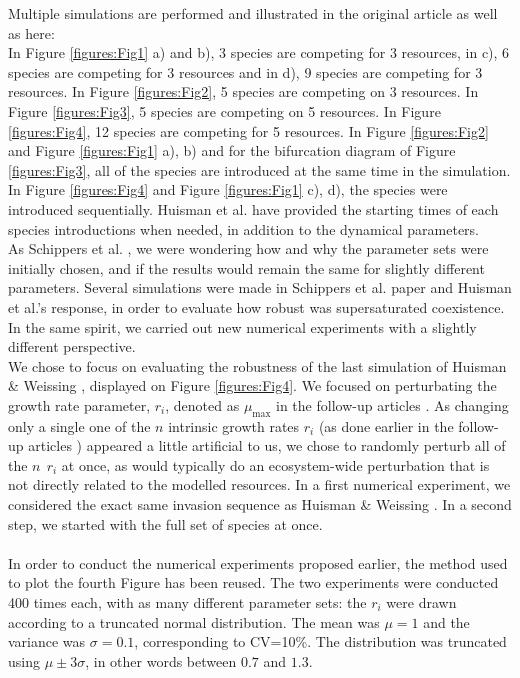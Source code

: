 Multiple simulations are performed and illustrated in the original article as well as here: \\
In Figure \ref{figures:Fig1} a) and b), 3 species are competing for 3 resources, in c), 6 species are competing for 3 resources and in d), 9 species are competing for 3 resources. In Figure \ref{figures:Fig2}, 5 species are competing on 3 resources. In Figure \ref{figures:Fig3}, 5 species are competing on 5 resources. In Figure \ref{figures:Fig4}, 12 species are competing for 5 resources. 
In Figure \ref{figures:Fig2} and Figure \ref{figures:Fig1} a), b) and for the 
bifurcation diagram of Figure \ref{figures:Fig3}, all of the species are 
introduced at the same time in the simulation. In Figure \ref{figures:Fig4} and 
Figure \ref{figures:Fig1} c), d), the species were introduced sequentially. 
Huisman et al. \cite{1999:Huisman} have provided the starting times 
of each species introductions when needed, in addition to the dynamical parameters.\\


As Schippers et al. \cite{2008:Schippers}, we were wondering how and why the parameter sets were initially chosen, 
and if the results would remain the same for slightly different parameters. Several simulations were made in 
Schippers et al. paper \cite{2008:Schippers} and Huisman et al.'s response\cite{2008:Huisman}, in order to evaluate how robust was supersaturated 
coexistence. In the same spirit, we carried out new numerical experiments with a slightly different perspective.\\

We chose to focus on evaluating the robustness of the last simulation of Huisman \& Weissing \cite{1999:Huisman}, displayed on Figure \ref{figures:Fig4}. We focused on perturbating the growth rate parameter, $r_i$, denoted as $\mu_{\text{max}}$ in the follow-up articles \cite{2008:Schippers,2008:Huisman}. 
As changing only a single one of the $n$ intrinsic growth rates $r_i$ (as done earlier in the follow-up articles \cite{2008:Schippers,2008:Huisman}) appeared a little artificial to us, 
we chose to randomly perturb all of the $n~~r_i$ at once, as would typically do an ecosystem-wide perturbation that is not directly related to the modelled resources. 
In a first numerical experiment, we considered the exact same invasion sequence as Huisman \& Weissing \cite{1999:Huisman}. 
In a second step, we started with the full set of species at once.\\
\\
In order to conduct the numerical experiments proposed earlier, the method used to plot the 
fourth Figure has been reused. The two experiments were conducted 400 times each, 
with as many different parameter sets: the $r_i$ were drawn according to a 
truncated normal distribution. The mean was $\mu=1$ and the variance was 
$\sigma=0.1$, corresponding to CV=10\%. The distribution was truncated using $\mu\pm3\sigma$, in other 
words between $0.7$ and $1.3$.\\~\\ 


